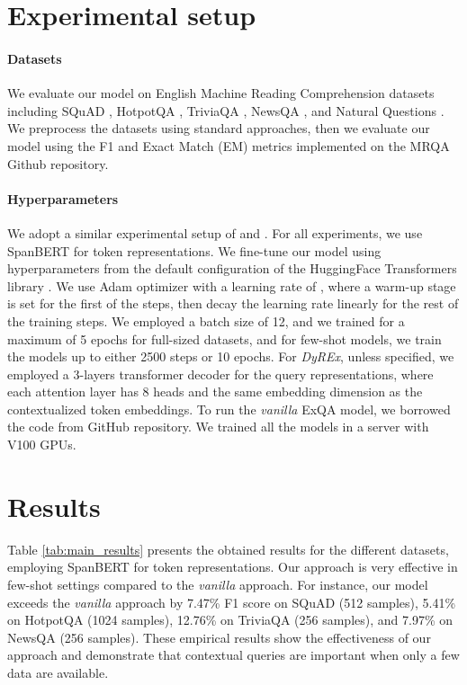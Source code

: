 \documentclass{article}
\begin{document}
\section{Experimental setup}
\label{sec:experimental_setup}

\paragraph{Datasets} We evaluate our model on English Machine Reading Comprehension datasets including SQuAD \citep{SQuAD}, HotpotQA \citep{HotpotQA}, TriviaQA \citep{TriviaQA}, NewsQA \citep{NewsQA}, and Natural Questions \citep{NaturalQs}. We preprocess the datasets using standard approaches, then we evaluate our model using the F1 and Exact Match (EM) metrics implemented on the MRQA Github repository.

\paragraph{Hyperparameters} We adopt a similar experimental setup of \citet{few_shot_QA} and \citet{span_BERT}. For all experiments, we use SpanBERT for token representations. We fine-tune our model using hyperparameters from the default configuration of the HuggingFace Transformers library \citep{transformers}. We use Adam optimizer with a learning rate of , where a warm-up stage is set for the first  of the steps, then decay the learning rate linearly for the rest of the training steps. We employed a batch size of 12, and we trained for a maximum of 5 epochs for full-sized datasets, and for few-shot models, we train the models up to either 2500 steps or 10 epochs. For \textit{DyREx}, unless specified, we employed a 3-layers transformer decoder for the query representations, where each attention layer has 8 heads and the same embedding dimension as the contextualized token embeddings. To run the \textit{vanilla} ExQA model, we borrowed the code from \citep{few_shot_QA} GitHub repository. We trained all the models in a server with V100 GPUs.



\section{Results}
\label{sec:results}

Table \ref{tab:main_results} presents the obtained results for the different datasets, employing SpanBERT for token representations.
Our approach is very effective in few-shot settings compared to the \textit{vanilla} approach. For instance, our model exceeds the \textit{vanilla} approach by 7.47\% F1 score on SQuAD (512 samples), 5.41\% on HotpotQA (1024 samples), 12.76\% on TriviaQA (256 samples), and 7.97\% on NewsQA (256 samples). These empirical results show the effectiveness of our approach and demonstrate that contextual queries are important when only a few data are available.
\end{document}
